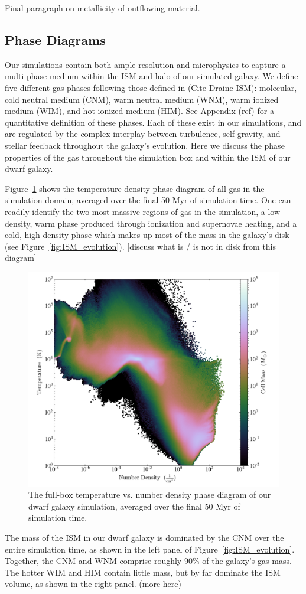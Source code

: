 \documentclass[twocolumn]{aastex61}
\begin{document}
Final paragraph on metallicity of outflowing material.

\subsection{Phase Diagrams}
\label{sec:phase}

Our simulations contain both ample resolution and microphysics to capture a multi-phase medium within the ISM and halo of our simulated galaxy. We define five different gas phases following those defined in (Cite Draine ISM): molecular, cold neutral medium (CNM), warm neutral medium (WNM), warm ionized medium (WIM), and hot ionized medium (HIM). See Appendix (ref) for a quantitative definition of these phases. Each of these exist in our simulations, and are regulated by the complex interplay between turbulence, self-gravity, and stellar feedback throughout the galaxy's evolution. Here we discuss the phase properties of the gas throughout the simulation box and within the ISM of our dwarf galaxy.

Figure~\ref{fig:phase} shows the temperature-density phase diagram of all gas in the simulation domain, averaged over the final 50 Myr of simulation time. One can readily identify the two most massive regions of gas in the simulation, a low density, warm phase produced through ionization and supernovae heating, and a cold, high density phase which makes up most of the mass in the galaxy's disk (see Figure~\ref{fig:ISM_evolution}). [discuss what is / is not in disk from this diagram]

\begin{figure}
\includegraphics[width=0.45\linewidth]{phase_diagram.png}
\caption{The full-box temperature vs. number density phase diagram of our dwarf galaxy simulation, averaged over the final 50 Myr of simulation time.}
\label{fig:phase}
\end{figure}

The mass of the ISM in our dwarf galaxy is dominated by the CNM over the entire simulation time, as shown in the left panel of Figure~\ref{fig:ISM_evolution}. Together, the CNM and WNM comprise roughly 90\% of the galaxy's gas mass. The hotter WIM and HIM contain little mass, but by far dominate the ISM volume, as shown in the right panel. (more here)
\end{document}
